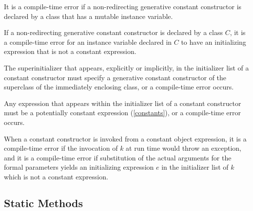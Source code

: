 \documentclass[makeidx]{article}
\begin{document}
\LMHash{}%
It is a compile-time error if a non-redirecting generative constant constructor
is declared by a class that has a mutable instance variable.


\LMHash{}%
If a non-redirecting generative constant constructor 
is declared by a class $C$,
it is a compile-time error
for an instance variable declared in $C$
to have an initializing expression that is not a constant expression.


\LMHash{}%
The superinitializer that appears, explicitly or implicitly,
in the initializer list of a constant constructor
must specify a generative constant constructor of
the superclass of the immediately enclosing class,
or a compile-time error occurs.

\LMHash{}%
Any expression that appears within
the initializer list of a constant constructor
must be a potentially constant expression
(\ref{constants}),
or a compile-time error occurs.

\LMHash{}%
When a constant constructor  is invoked from
a constant object expression,
it is a compile-time error if
the invocation of $k$ at run time would throw an exception,
and it is a compile-time error if
substitution of the actual arguments for the formal parameters
yields an initializing expression $e$ in the initializer list of $k$
which is not a constant expression.



\subsection{Static Methods}
\end{document}
